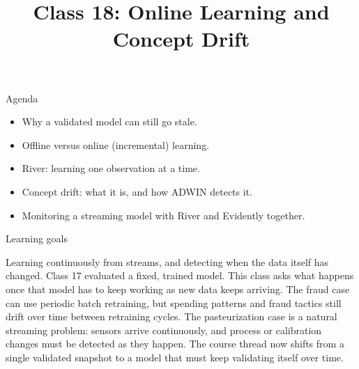 

\title{Class 18: Online Learning and Concept Drift}
\author{\coursename}
\date{}



\frame{\titlepage \coursefooter}

\begin{frame}{Agenda}
\begin{itemize}
\item Why a validated model can still go stale.
\item Offline versus online (incremental) learning.
\item River: learning one observation at a time.
\item Concept drift: what it is, and how ADWIN detects it.
\item Monitoring a streaming model with River and Evidently together.
\end{itemize}
\coursefooter
\end{frame}

\begin{frame}{Learning goals}
\coursefooter
\end{frame}

\coursecontextframe
{Learning continuously from streams, and detecting when the data itself has changed.}
{Class 17 evaluated a fixed, trained model. This class asks what happens once that model has to keep working as new data keeps arriving.}
{The fraud case can use periodic batch retraining, but spending patterns and fraud tactics still drift over time between retraining cycles.}
{The pasteurization case is a natural streaming problem: sensors arrive continuously, and process or calibration changes must be detected as they happen.}
{The course thread now shifts from a single validated snapshot to a model that must keep validating itself over time.}

